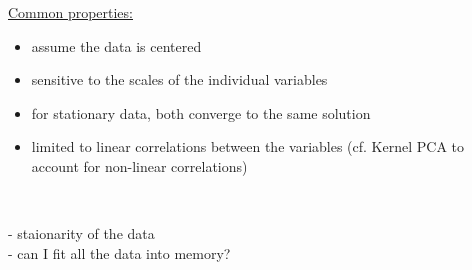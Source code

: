 \begin{frame}\frametitle{\secname}

\underline{Common properties:}

\begin{itemize}
\item assume the data is centered
\item sensitive to the scales of the individual variables
\item for stationary data, both converge to the same solution
\item limited to linear correlations between the variables (cf. Kernel PCA to account for non-linear correlations)
\end{itemize}

\pause

\\


\pause

- staionarity of the data\\
- can I fit all the data into memory?


\end{frame}
